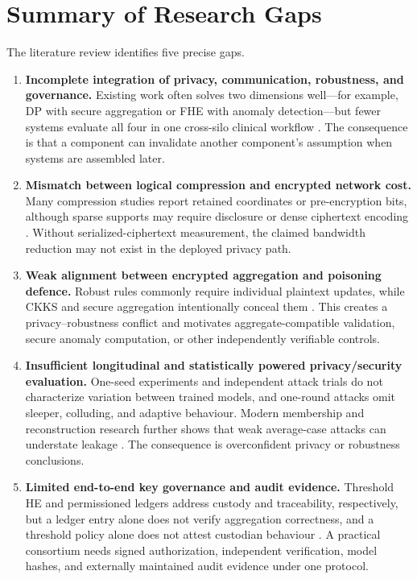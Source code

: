\section{Summary of Research Gaps}
\label{sec:research-gaps}

The literature review identifies five precise gaps.

\begin{enumerate}
    \item \textbf{Incomplete integration of privacy, communication, robustness, and governance.} Existing work often solves two dimensions well---for example, DP with secure aggregation or FHE with anomaly detection---but fewer systems evaluate all four in one cross-silo clinical workflow \cite{stevens2022fldp,xu2024ddfed,gu2025dpbrem}. The consequence is that a component can invalidate another component's assumption when systems are assembled later.

    \item \textbf{Mismatch between logical compression and encrypted network cost.} Many compression studies report retained coordinates or pre-encryption bits, although sparse supports may require disclosure or dense ciphertext encoding \cite{li2022soteriafl,li2023fedef}. Without serialized-ciphertext measurement, the claimed bandwidth reduction may not exist in the deployed privacy path.

    \item \textbf{Weak alignment between encrypted aggregation and poisoning defence.} Robust rules commonly require individual plaintext updates, while CKKS and secure aggregation intentionally conceal them \cite{blanchard2017krum,yin2018byzantine,bonawitz2017practical}. This creates a privacy--robustness conflict and motivates aggregate-compatible validation, secure anomaly computation, or other independently verifiable controls.

    \item \textbf{Insufficient longitudinal and statistically powered privacy/security evaluation.} One-seed experiments and independent attack trials do not characterize variation between trained models, and one-round attacks omit sleeper, colluding, and adaptive behaviour. Modern membership and reconstruction research further shows that weak average-case attacks can understate leakage \cite{carlini2022membership,geiping2020inverting}. The consequence is overconfident privacy or robustness conclusions.

    \item \textbf{Limited end-to-end key governance and audit evidence.} Threshold HE and permissioned ledgers address custody and traceability, respectively, but a ledger entry alone does not verify aggregation correctness, and a threshold policy alone does not attest custodian behaviour \cite{mouchet2021multiparty,androulaki2018hyperledger}. A practical consortium needs signed authorization, independent verification, model hashes, and externally maintained audit evidence under one protocol.
\end{enumerate}

